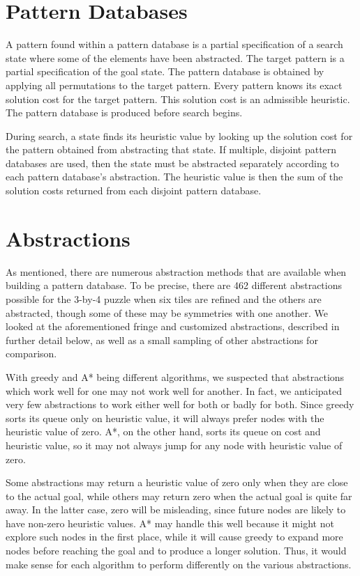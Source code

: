 \documentclass[letterpaper]{article}
\begin{document}
\section{Pattern Databases}

A pattern found within a pattern database is a partial specification of a search state where some of the elements have been abstracted.  The target pattern is a partial specification of the goal state.  The pattern database is obtained by applying all permutations to the target pattern.  Every pattern knows its exact solution cost for the target pattern.  This solution cost is an admissible heuristic.  The pattern database is produced before search begins.

During search, a state finds its heuristic value by looking up the solution cost for the pattern obtained from abstracting that state.  If multiple, disjoint pattern databases are used, then the state must be abstracted separately according to each pattern database's abstraction.  The heuristic value is then the sum of the solution costs returned from each disjoint pattern database.

\section{Abstractions}

As mentioned, there are numerous abstraction methods that are available when building a pattern database.  To be precise, there are 462 different abstractions possible for the 3-by-4 puzzle when six tiles are refined and the others are abstracted, though some of these may be symmetries with one another.  We looked at the aforementioned fringe and customized abstractions, described in further detail below, as well as a small sampling of other abstractions for comparison.

With greedy and A* being different algorithms, we suspected that abstractions which work well for one may not work well for another.  In fact, we anticipated very few abstractions to work either well for both or badly for both.  Since greedy sorts its queue only on heuristic value, it will always prefer nodes with the heuristic value of zero.  A*, on the other hand, sorts its queue on cost and heuristic value, so it may not always jump for any node with heuristic value of zero.  

Some abstractions may return a heuristic value of zero only when they are close to the actual goal, while others may return zero when the actual goal is quite far away.  In the latter case, zero will be misleading, since future nodes are likely to have non-zero heuristic values.  A* may handle this well because it might not explore such nodes in the first place, while it will cause greedy to expand more nodes before reaching the goal and to produce a longer solution.  Thus, it would make sense for each algorithm to perform differently on the various abstractions.
\end{document}
